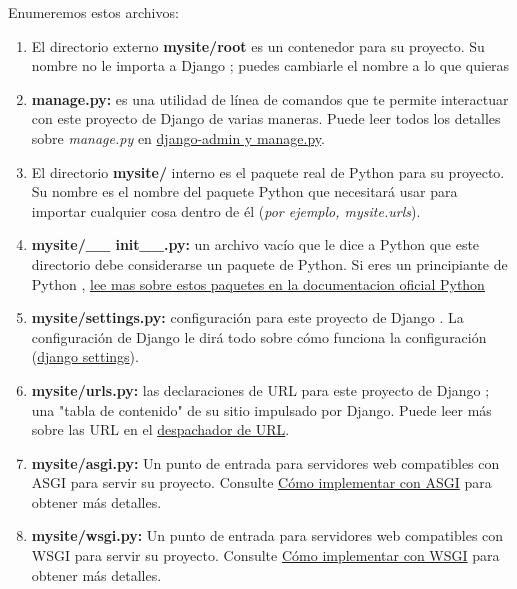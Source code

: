 \documentclass[10pt]{article}
\newcommand{\py}[1]{{\textcolor{B}{Python} #1}}
\newcommand{\django}[1]{{\textcolor{G}{Django} #1}}
\begin{document}
Enumeremos estos archivos:

\begin{enumerate}
\item 
El directorio externo \textbf{mysite/root} es un contenedor para su proyecto. Su nombre no le importa a \django{}; puedes cambiarle el nombre a lo que quieras

\item 
\textbf{manage.py:} es una utilidad de línea de comandos que te permite interactuar con este proyecto de \django{} de varias maneras. Puede leer todos los detalles sobre \textit{manage.py} en \textcolor{B}{\href{https://docs.djangoproject.com/en/3.0/ref/django-admin/}{django-admin y manage.py}}.

\item 
El directorio \textbf{mysite/} interno es el paquete real de \py{} para su proyecto. Su nombre es el nombre del paquete \py{} que necesitará usar para importar cualquier cosa dentro de él (\textit{por ejemplo, mysite.urls}). 

\item
\textbf{mysite/\_\_ init\_\_.py:} un archivo vacío que le dice a Python que este directorio debe considerarse un paquete de Python. Si eres un principiante de \py{}, 
{\textcolor{B}{\href{https://docs.python.org/3/tutorial/modules.html}{lee mas sobre estos paquetes en la documentacion oficial  \py{}}}}

\item 
\textbf{mysite/settings.py:}  configuración para este proyecto de \django{}. La configuración de \django{} le dirá todo sobre cómo funciona la configuración ({\textcolor{B}{\href{https://docs.djangoproject.com/en/3.0/topics/settings/}{django settings}}}).

\item 
\textbf{mysite/urls.py:} las declaraciones de URL para este proyecto de \django{}; una "tabla de contenido" de su sitio impulsado por Django. Puede leer más sobre las URL en el
{\textcolor{B}{\href{https://docs.djangoproject.com/en/3.0/topics/http/urls/}{despachador de URL}}}.

\item 
\textbf{mysite/asgi.py:} Un punto de entrada para servidores web compatibles con ASGI para servir su proyecto. Consulte 
{\textcolor{B}{\href{https://docs.djangoproject.com/en/3.0/howto/deployment/asgi/}{Cómo implementar con ASGI}}} para obtener más detalles.

\item 
\textbf{mysite/wsgi.py:} 
Un punto de entrada para servidores web compatibles con WSGI para servir su proyecto. 
 Consulte {\textcolor{B}{\href{https://docs.djangoproject.com/en/3.0/howto/deployment/wsgi/}{Cómo implementar con WSGI}}} para obtener más detalles.

\end{enumerate}
\end{document}
